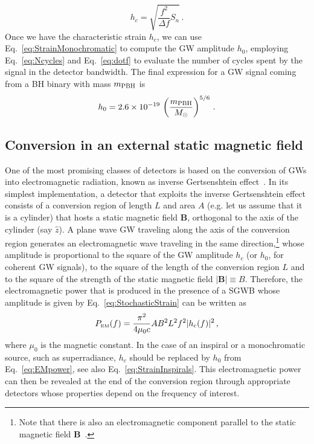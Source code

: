 \documentclass[11pt,a4paper]{article}
\begin{document}
{\begin{equation}
h_c = \sqrt{\frac{f^2}{\Delta f} S_n} \,.
\end{equation}
Once we have the characteristic strain $h_c$, we can use Eq.~\eqref{eq:StrainMonochromatic} to compute the GW amplitude $h_0$, employing Eq.~\eqref{eq:Ncycles} and Eq.~\eqref{eq:dotf} to evaluate the number of cycles spent by the signal in the detector bandwidth. The final expression for a GW signal coming from a BH binary with mass $m_{\rm PBH}$ is
\begin{equation}
h_0 = 2.6 \times 10^{-19} \, \left(\frac{m_{\rm PBH}}{M_\odot}\right)^{5/6} \,.
\end{equation}
}

\subsection{Conversion in an external static magnetic field}
\label{sec:GertEffect}

One of the most promising classes of detectors is based on the conversion of GWs into electromagnetic radiation, known as inverse Gertsenshtein effect~\cite{gertsenshtein1962wave, Boccaletti1970ConversionOP}. In its simplest implementation, a detector that exploits the inverse Gertsenshtein effect consists of a conversion region of length $L$ and area $A$ (e.g. let us assume that it is a cylinder) that hosts a static magnetic field $\mathbf{B}$, orthogonal to the axis of the cylinder (say $\hat{z}$). A plane wave GW traveling along the axis of the conversion region generates an electromagnetic wave traveling in the same direction,\footnote{Note that there is also an electromagnetic component parallel to the static magnetic field $\mathbf{B}$~\cite{Berlin:2021txa}.} whose amplitude is proportional to the square of the GW amplitude $h_c$ (or $h_0$, for coherent GW signals), to the square of the length of the conversion region $L$ and to the square of the strength of the static magnetic field $|\mathbf{B}| \equiv B$. Therefore, the electromagnetic power that is produced in the presence of a SGWB whose amplitude is given by Eq.~\eqref{eq:StochasticStrain} can be written as
\begin{equation}
\label{eq:EMpower}
P_\text{\tiny EM}(f) = \frac{\pi^2}{4 \mu_0 c} A B^2 L^2 f^2 |h_c(f)|^2 \,,
\end{equation}
where $\mu_0$ is the magnetic constant. In the case of an inspiral or a monochromatic source, such as superradiance, $h_c$ should be replaced by $h_0$ from Eq.~\eqref{eq:EMpower}, see also Eq.~\eqref{eq:StrainInspirals}. This electromagnetic power can then be revealed at the end of the conversion region through appropriate detectors whose properties depend on the frequency of interest.
\end{document}
